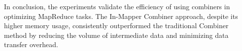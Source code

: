\documentclass[a4paper, 12pt]{article}
\begin{document}
\noindent In conclusion, the experiments validate the efficiency of using combiners in optimizing MapReduce tasks. The In-Mapper Combiner approach, despite its higher memory usage, consistently outperformed the traditional Combiner method by reducing the volume of intermediate data and minimizing data transfer overhead. 
\end{document}
